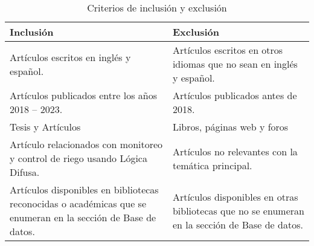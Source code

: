\begin{table}[h]
    \centering
    \caption{Criterios de inclusión y exclusión}
    \label{tabla_1}
    \begin{tabular}{|p{6cm}|p{6cm}|}
    \hline
    \textbf{Inclusión} & \textbf{Exclusión} \\
    \hline
    Artículos escritos en inglés y español. & Artículos escritos en otros idiomas que no sean en inglés y español. \\
    Artículos publicados entre los años 2018 – 2023. & Artículos publicados antes de 2018. \\
    Tesis y Artículos & Libros, páginas web y foros \\
    Artículo relacionados con monitoreo y control de riego usando Lógica Difusa. & Artículos no relevantes con la temática principal. \\
    Artículos disponibles en bibliotecas reconocidas o académicas que se enumeran en la sección de Base de datos. & Artículos disponibles en otras bibliotecas que no se enumeran en la sección de Base de datos. \\
    \hline
    \end{tabular}
    \end{table}
    